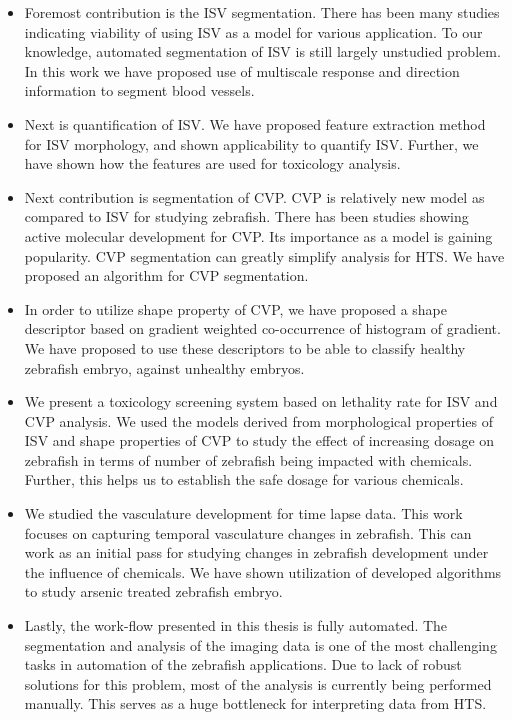 \begin{itemize}
\item Foremost contribution is the ISV segmentation. There has been many studies indicating viability of using ISV as a model for various application. To our knowledge, automated segmentation of ISV is still largely unstudied problem. In this work we have proposed use of multiscale response and direction information to segment blood vessels.

\item Next is quantification of ISV. We have proposed feature extraction method for ISV morphology, and shown applicability to quantify ISV. Further, we have shown how the features are used for toxicology analysis. 
 
\item Next contribution is segmentation of CVP. CVP is relatively new model as compared to ISV for studying zebrafish. There has been studies showing active molecular development for CVP. Its importance as a model is gaining popularity. CVP segmentation can greatly simplify analysis for HTS. We have proposed an algorithm for CVP segmentation. 

\item In order to utilize shape property of CVP, we have proposed a shape descriptor based on gradient weighted co-occurrence of histogram of gradient. We have proposed to use these descriptors to be able to classify healthy zebrafish embryo, against unhealthy embryos. 

\item We present a toxicology screening system based on lethality rate for ISV and CVP analysis. We used the models derived from morphological properties of ISV and shape properties of CVP to study the effect of increasing dosage on zebrafish in terms of number of zebrafish being impacted with chemicals. Further, this helps us to establish the safe dosage for various chemicals.

\item We studied the vasculature development for time lapse data. This work focuses on capturing temporal vasculature changes in zebrafish. This can work as an initial pass for studying changes in zebrafish development under the influence of chemicals. We have shown utilization of developed algorithms to study arsenic treated zebrafish embryo. 

\item Lastly, the work-flow presented in this thesis is fully automated. The segmentation and analysis of the imaging data is one of the most challenging tasks in automation of the zebrafish applications. Due to lack of robust solutions for this problem, most of the analysis is currently being performed manually. This serves as a huge bottleneck for interpreting data from HTS.

\end{itemize}


